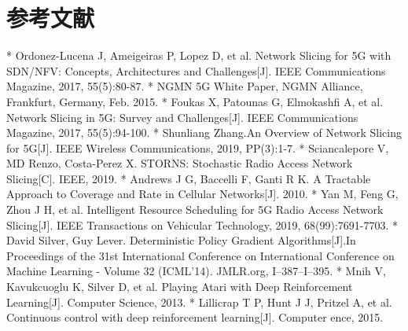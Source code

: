 \section{参考文献}
    * Ordonez-Lucena J, Ameigeiras P, Lopez D, et al. Network Slicing for 5G with SDN/NFV: Concepts, Architectures and Challenges[J]. IEEE Communications Magazine, 2017, 55(5):80-87.
    * NGMN 5G White Paper, NGMN Alliance, Frankfurt, Germany, Feb. 2015.
    * Foukas X, Patounas G, Elmokashfi A, et al. Network Slicing in 5G: Survey and Challenges[J]. IEEE Communications Magazine, 2017, 55(5):94-100.
    * Shunliang Zhang.An Overview of Network Slicing for 5G[J]. IEEE Wireless Communications, 2019, PP(3):1-7.
    * Sciancalepore V, MD Renzo, Costa-Perez X. STORNS: Stochastic Radio Access Network Slicing[C]. IEEE, 2019.
    * Andrews J G, Baccelli F, Ganti R K. A Tractable Approach to Coverage and Rate in Cellular Networks[J]. 2010.
    * Yan M, Feng G, Zhou J H, et al. Intelligent Resource Scheduling for 5G Radio Access Network Slicing[J]. IEEE Transactions on Vehicular Technology, 2019, 68(99):7691-7703.
    * David Silver, Guy Lever. Deterministic Policy Gradient Algorithms[J].In Proceedings of the 31st International Conference on International Conference on Machine Learning - Volume 32 (ICML'14). JMLR.org, I–387–I–395.
    * Mnih V, Kavukcuoglu K, Silver D, et al. Playing Atari with Deep Reinforcement Learning[J]. Computer Science, 2013.
    * Lillicrap T P, Hunt J J, Pritzel A, et al. Continuous control with deep reinforcement learning[J]. Computer ence, 2015.
    
